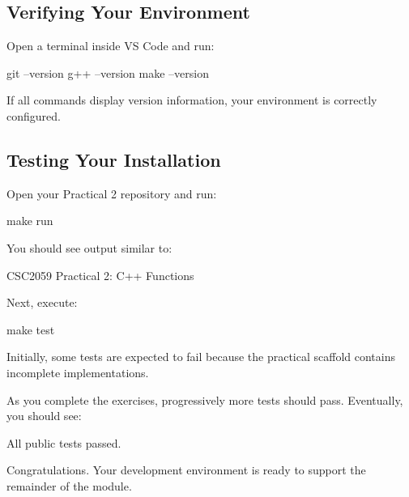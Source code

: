 \documentclass{csc2059practical}
\begin{document}
\subsection{Verifying Your Environment}

Open a terminal inside VS Code and run:

\begin{bashcode}
git --version
g++ --version
make --version
\end{bashcode}

If all commands display version information, your environment is correctly configured.

\subsection{Testing Your Installation}

Open your Practical 2 repository and run:

\begin{bashcode}
make run
\end{bashcode}

You should see output similar to:

\begin{terminal}
CSC2059 Practical 2: C++ Functions
\end{terminal}

Next, execute:

\begin{bashcode}
make test
\end{bashcode}

Initially, some tests are expected to fail because the practical scaffold contains incomplete implementations.

As you complete the exercises, progressively more tests should pass. Eventually, you should see:

\begin{terminal}
All public tests passed.
\end{terminal}

Congratulations. Your development environment is ready to support the remainder of the module.
\end{document}

